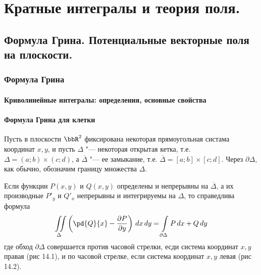 \part[Кратные интегралы и теория поля.]{Кратные интегралы и теория поля.}%

\chapter{Формула Грина. Потенциальные векторные поля на плоскости.}
\section{Формула Грина} 

\subsection{Криволинейные интегралы: определения, основные свойства}

\subsection{Формула Грина для клетки}

Пусть в плоскости $\bbR^2$ фиксирована некоторая прямоугольная систама координат $x,y$, и пусть $\Delta$ "--- некоторая открытая кетка, т.е. $\Delta = (a;b)\times(c;d)$, а $\overline{\Delta}$ "--- ее замыкание, т.е. $\overline{\Delta}=[a;b]\times[c;d]$. Через $\partial \Delta$, как обычно, обозначим границу множества $\Delta$.


\begin{lemm}
Если функции $P(x,y)$ и $Q(x,y)$ определены и непрерывны на $\overline{\Delta}$, а их производные $P'_y$ и $Q'_x$ непрерывны и интегрируемы на $\Delta$, то справедлива формула
\begin{equation} \label{Grin}
\iint\limits_{\Delta} \left( \pd{Q}{x}-\frac{\partial P}{\partial y} \right)\,dx\,dy = \int\limits_{\partial \Delta} P\,dx + Q\,dy
\end{equation}
где обход $\partial\Delta$ совершается против часовой стрелки, есди система координат $x,y$ правая (рис 14.1), и по часовой стрелке, если система координат $x,y$ левая (рис 14.2).
\end{lemm}

